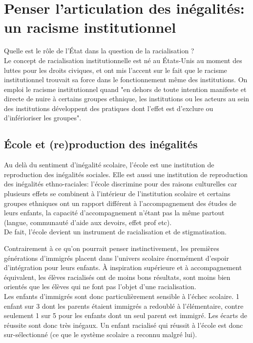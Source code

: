 \documentclass[10pt, a4paper, openany]{book}
\begin{document}
\section{Penser l'articulation des inégalités: un racisme institutionnel}

Quelle est le rôle de l'État dans la question de la racialisation ? \\
Le concept de racialisation institutionnelle est né au États-Unis au moment des luttes pour les droits civiques, et ont mis l'accent sur le fait que le racisme institutionnel trouvait sa force dans le fonctionnement même des institutions. On emploi le racisme institutionnel quand "en dehors de toute intention manifeste et directe de nuire à certains groupes ethnique, les institutions ou les acteurs au sein des institutions développent des pratiques dont l'effet est d'exclure ou d'inférioriser les groupes".

\subsection{École et (re)production des inégalités}

Au delà du sentiment d'inégalité scolaire, l'école est une institution de reproduction des inégalités sociales. Elle est aussi une institution de reproduction des inégalités ethno-raciales: l'école discrimine pour des raisons culturelles car plusieurs effets se combinent à l'intérieur de l'institution scolaire et certains groupes ethniques ont un rapport différent à l'accompagnement des études de leurs enfants, la capacité d'accompagnement n'étant pas la même partout (langue, communauté d'aide aux devoirs, effet prof etc). \\
De fait, l'école devient un instrument de racialisation et de stigmatisation.


Contrairement à ce qu'on pourrait penser instinctivement, les premières générations d'immigrés placent dans l'univers scolaire énormément d'espoir d'intégration pour leurs enfants. À inspiration supérieure et à accompagnement équivalent, les élèves racialisés ont de moins bons résultats, sont moins bien orientés que les élèves qui ne font pas l'objet d'une racialisation. \\
Les enfants d'immigrés sont donc particulièrement sensible à l'échec scolaire. 1 enfant sur 3 dont les parents étaient immigrés a redoublé à l'élémentaire, contre seulement 1 sur 5 pour les enfants dont un seul parent est immigré. Les écarts de réussite sont donc très inégaux. Un enfant racialisé qui réussit à l'école est donc sur-sélectionné (ce que le système scolaire a reconnu malgré lui).
\end{document}
